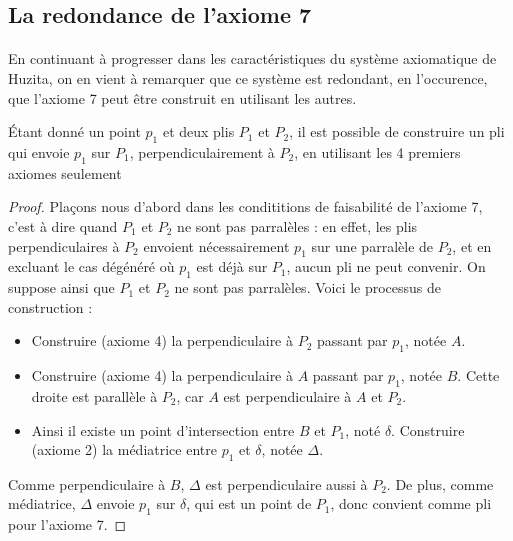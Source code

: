 \documentclass[a4paper,12pt,french,draft]{report}
\begin{document}
\subsection{La redondance de l'axiome 7}
		
		\paragraph{} En continuant à progresser dans les caractéristiques du système axiomatique de Huzita, on en vient à remarquer que ce système est redondant, en l'occurence, que l'axiome 7 peut être construit en utilisant les autres.
		
		\begin{proposition}
			Étant donné un point $p_{1}$ et deux plis $P_{1}$ et $P_{2}$, il est possible de construire un pli qui envoie $p_{1}$ sur $P_{1}$, perpendiculairement à $P_{2}$, en utilisant les 4 premiers axiomes seulement
		\end{proposition}
		
		
		\begin{proof}
			Plaçons nous d'abord dans les condititions de faisabilité de l'axiome 7, c'est à dire quand $P_{1}$ et $P_{2}$ ne sont pas parralèles : en effet, les plis perpendiculaires à $P_{2}$ envoient nécessairement $p_{1}$ sur une parralèle de $P_{2}$, et en excluant le cas dégénéré où $p_{1}$ est déjà sur $P_{1}$, aucun pli ne peut convenir. On suppose ainsi que $P_{1}$ et $P_{2}$ ne sont pas parralèles. Voici le processus de construction : 
			\begin{itemize}
				\item Construire (axiome 4) la perpendiculaire à $P_{2}$ passant par $p_{1}$, notée $A$.
				\item Construire (axiome 4) la perpendiculaire à $A$ passant par $p_{1}$, notée $B$. Cette droite est parallèle à $P_{2}$, car $A$ est perpendiculaire à $A$ et $P_{2}$.
				\item Ainsi il existe un point d'intersection entre $B$ et $P_{1}$, noté $\delta$. Construire (axiome 2) la médiatrice entre $p_{1}$ et $\delta$, notée $\Delta$.
			\end{itemize}
			Comme perpendiculaire à $B$, $\Delta$ est perpendiculaire aussi à $P_{2}$. De plus, comme médiatrice, $\Delta$ envoie $p_{1}$ sur $\delta$, qui est un point de $P_{1}$, donc convient comme pli pour l'axiome 7.
		\end{proof}
		
\end{document}

